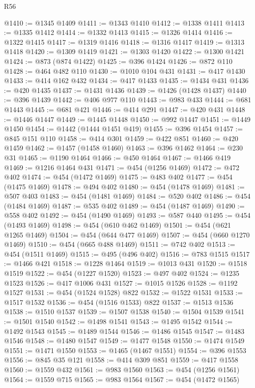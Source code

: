 \begin{lexlean}{R56}
\begin{coremodule}
@1410 := @1345 @1409
@1411 := @1343 @1410
@1412 := @1338 @1411
@1413 := @1335 @1412
@1414 := @1332 @1413
@1415 := @1326 @1414
@1416 := @1322 @1415
@1417 := @1319 @1416
@1418 := @1316 @1417
@1419 := @1313 @1418
@1420 := @1309 @1419
@1421 := @1303 @1420
@1422 := @1300 @1421
@1424 := @873 (@874 @1422)
@1425 := @396 @1424
@1426 := @872 @110
@1428 := @464 @482 @110
@1430 := @1010 @104 @431
@1431 := @417 @1430
@1433 := @414 @162 @432
@1434 := @417 @1433
@1435 := @1434 @431
@1436 := @420 @1435
@1437 := @1431 @1436
@1439 := @1426 (@1428 @1437)
@1440 := @396 @1439
@1442 := @406 @977 @110
@1443 := @983 @433
@1444 := @681 @1443
@1445 := @681 @421
@1446 := @414 @291
@1447 := @420 @431
@1448 := @1446 @1447
@1449 := @1445 @1448
@1450 := @992 @1447
@1451 := @1449 @1450
@1454 := @1442 (@1444 @1451 @419)
@1455 := @396 @1454
@1457 := @845 @151 @110
@1458 := @414 @301
@1459 := @422 @851
@1460 := @420 @1459
@1462 := @1457 (@1458 @1460)
@1463 := @396 @1462
@1464 := @230 @31
@1465 := @1190 @1464
@1466 := @450 @1464
@1467 := @1466 @419
@1469 := @1216 @1464 @431
@1471 := @454 (@1256 @1469)
@1472 := @472 @402
@1474 := @454 (@1472 @1469)
@1475 := @483 @402
@1477 := @454 (@1475 @1469)
@1478 := @494 @402
@1480 := @454 (@1478 @1469)
@1481 := @507 @403
@1483 := @454 (@1481 @1469)
@1484 := @520 @402
@1486 := @454 (@1484 @1469)
@1487 := @535 @402
@1489 := @454 (@1487 @1469)
@1490 := @558 @402
@1492 := @454 (@1490 @1469)
@1493 := @587 @440
@1495 := @454 (@1493 @1469)
@1498 := @454 (@610 @462 @1469)
@1501 := @454 (@621 @1265 @1469)
@1504 := @454 (@644 @477 @1469)
@1507 := @454 (@660 @1270 @1469)
@1510 := @454 (@665 @488 @1469)
@1511 := @742 @402
@1513 := @454 (@1511 @1469)
@1515 := @495 (@496 @402)
@1516 := @783 @1515
@1517 := @1466 @421
@1518 := @1228 @1464
@1519 := @1013 @431
@1520 := @1518 @1519
@1522 := @454 (@1227 @1520)
@1523 := @497 @402
@1524 := @1235 @1523
@1526 := @417 @1006 @431
@1527 := @1015 @1526
@1528 := @1192 @1527
@1531 := @454 (@1524 @1528) @822
@1532 := @1522 @1531
@1533 := @1517 @1532
@1536 := @454 (@1516 @1533) @822
@1537 := @1513 @1536
@1538 := @1510 @1537
@1539 := @1507 @1538
@1540 := @1504 @1539
@1541 := @1501 @1540
@1542 := @1498 @1541
@1543 := @1495 @1542
@1544 := @1492 @1543
@1545 := @1489 @1544
@1546 := @1486 @1545
@1547 := @1483 @1546
@1548 := @1480 @1547
@1549 := @1477 @1548
@1550 := @1474 @1549
@1551 := @1471 @1550
@1553 := @1465 (@1467 @1551)
@1554 := @396 @1553
@1556 := @845 @35 @121
@1558 := @414 @309 @851
@1559 := @417 @1558
@1560 := @1559 @432
@1561 := @983 @1560
@1563 := @454 (@1256 @1561)
@1564 := @1559 @715
@1565 := @983 @1564
@1567 := @454 (@1472 @1565)

\end{coremodule}
\end{lexlean}
